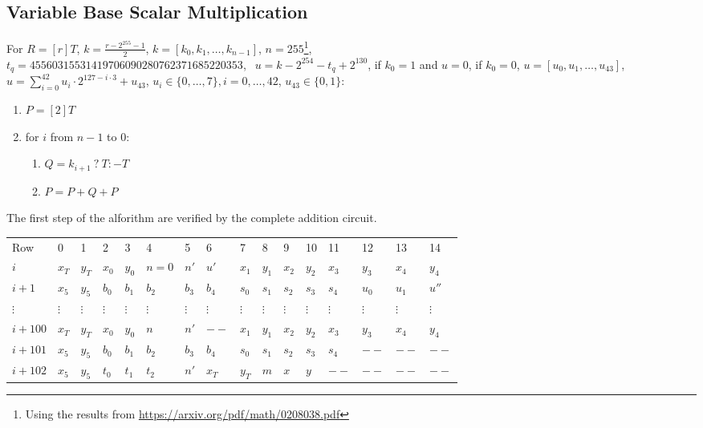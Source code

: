 \subsection{Variable Base Scalar Multiplication}
For $R  = [r]T$, $k = \frac{r - 2^{255} - 1}{2}$, $k = [k_0, k_1, \dots, k_{n - 1}]$, $n = 255$\footnote{Using the results from \url{https://arxiv.org/pdf/math/0208038.pdf}}, \\$t_q = 45560315531419706090280762371685220353$,
$~~u=k- 2^{254} - t_q+2^{130}$, if $k_0 = 1$ and $u = 0$, if $k_0 = 0$, $u = [u_0, u_1, \dots, u_{43}]$, $u=\sum_{i=0}^{42}u_i\cdot 2^{127-i \cdot 3} + u_{43}$, $u_i \in \{0,\dots, 7\}, i=0,\dots, 42$, $u_{43} \in \{0,1\}$:
\begin{enumerate}
    \item $P = [2]T$
    \item for $i$ from $n - 1$ to $0$:
    \begin{enumerate}
        \item $Q = k_{i + 1} \: ? \: T : -T$
        \item $P = P + Q + P$
    \end{enumerate}
\end{enumerate}

The first step of the alforithm are verified by the complete addition circuit. 

\begin{center}
    \begin{table}[H]
        \begin{tabular}{llllllllllllllll}
            Row     & 0        & 1        & 2        & 3        & 4        & 5        & 6        & 7        & 8        & 9        & 10       & 11       & 12       & 13       & 14       \\
            $i$    & $x_T$    & $y_T$    & $x_0$    & $y_0$    & $n = 0$    & $n'$    & $u'$    & $x_1$    & $y_1$    & $x_2$    & $y_2$    & $x_3$    & $y_3$ & $x_4$ & $y_4$ \\
            $i + 1$   & $x_5$    & $y_5$    & $b_0$    & $b_1$    & $b_2$    & $b_3$    & $b_4$      & $s_0$    & $s_1$    & $s_2$    & $s_3$    & $s_4$    & $u_0$ & $u_1$ & $u''$ \\
            $\vdots$  & $\vdots$ & $\vdots$ & $\vdots$ & $\vdots$ & $\vdots$ & $\vdots$ & $\vdots$ & $\vdots$ & $\vdots$ & $\vdots$ & $\vdots$ & $\vdots$ & $\vdots$ & $\vdots$ & $\vdots$ \\
            $i + 100$ & $x_T$    & $y_T$    & $x_0$    & $y_0$    & $n$    & $n'$    & $--$    & $x_1$    & $y_1$    & $x_2$    & $y_2$    & $x_3$    & $y_3$ & $x_4$ & $y_4$ \\
            $i + 101$ & $x_5$    & $y_5$    & $b_0$    & $b_1$    & $b_2$    & $b_3$    & $b_4$      & $s_0$    & $s_1$    & $s_2$    & $s_3$    & $s_4$    & $--$ & $--$ & $--$ \\
            $i + 102$ & $x_5$    & $y_5$    & $t_0$    & $t_1$    & $t_2$    & $n'$    & $x_T$      & $y_T$    & $m$    & $x$    & $y$    & $--$    & $--$ & $--$ & $--$ \\
        \end{tabular}
    \end{table}
\end{center}

